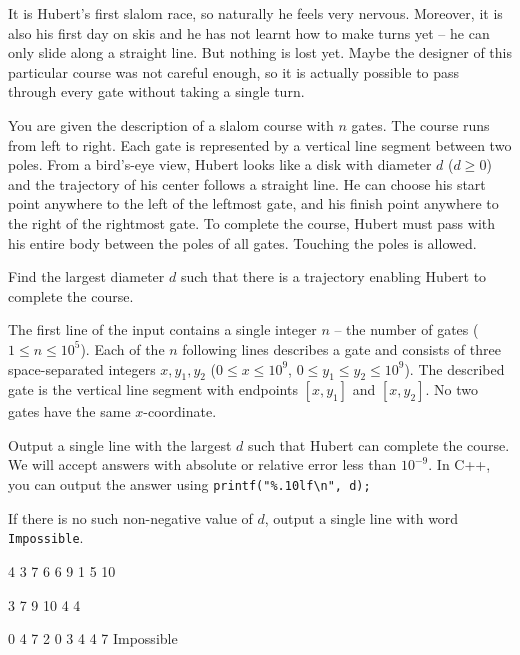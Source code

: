 





It is Hubert's first slalom race, so naturally he feels very nervous. Moreover,
it is also his first day on skis and he has not learnt how to make turns yet --
he can only slide along a straight line. But nothing is lost yet. Maybe the
designer of this particular course was not careful enough, so it is actually
possible to pass through every gate without taking a single turn.



You are given the description of a slalom course with $n$ gates. The course runs
from left to right. Each gate is represented by a vertical line segment between
two poles. From a bird's-eye view, Hubert looks like a disk with diameter $d$
($d \geq 0$) and the trajectory of his center follows a straight line. He can
choose his start point anywhere to the left of the leftmost gate, and his finish
point anywhere to the right of the rightmost gate. To complete the course,
Hubert must pass with his entire body between the poles of all gates. Touching
the poles is allowed.

Find the largest diameter $d$ such that there is a trajectory enabling Hubert to
complete the course.



The first line of the input contains a single integer $n$ -- the number of gates
($1 \leq n \leq 10^5$). Each of the $n$ following lines describes a gate and
consists of three space-separated integers $x, y_1, y_2$ ($0 \leq x \leq 10^9$,
$0 \leq y_1 \leq y_2 \leq 10^9$). The described gate is the vertical line
segment with endpoints $[x, y_1]$ and $[x, y_2]$. No two gates have the same
$x$-coordinate.



Output a single line with the largest $d$ such that Hubert can complete the
course. We will accept answers with absolute or relative error less than
$10^{-9}$. In C++, you can output the answer using
\verb!printf("%.10lf\n", d);!

If there is no such non-negative value of $d$, output a single line with word
\texttt{Impossible}.



4 3 7
6 6 9
1 5 10
\sampleEND

3 7 9
10 4 4
\sampleEND

0 4 7
2 0 3
4 4 7
\sampleOUT
Impossible
\sampleEND



